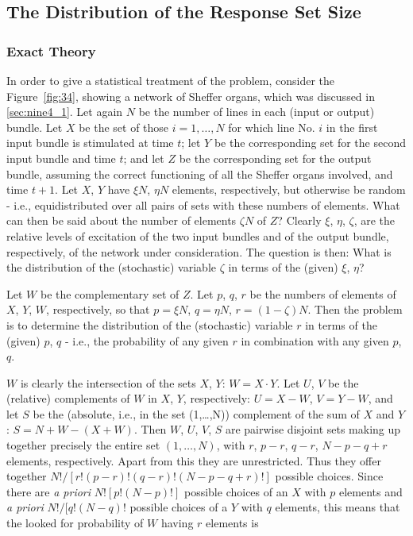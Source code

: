 \documentclass[twocolumn,preprintnumbers,amsmath,amssymb,floatfix]{revtex4}
\begin{document}
\subsection{\label{sec:ten2}The Distribution of the Response Set Size}

\subsubsection{\label{sec:ten2_1}Exact Theory} In order to give a
statistical treatment of the problem, consider the
Figure~\ref{fig:34}, showing a network of Sheffer organs, which
was discussed in \ref{sec:nine4_1}. Let again $N$ be the number of
lines in each (input or output) bundle. Let $X$ be the set of
those $i=1,\dots,N$ for which line No. $i$ in the first input
bundle is stimulated at time $t$; let $Y$ be the corresponding set
for the second input bundle and time $t$; and let $Z$ be the
corresponding set for the output bundle, assuming the correct
functioning of all the Sheffer organs involved, and time $t+1$.
Let $X$, $Y$ have $\xi N$, $\eta N$ elements, respectively, but
otherwise be random - i.e., equidistributed over all pairs of sets
with these numbers of elements. What can then be said about the
number of elements $\zeta N$ of $Z$? Clearly $\xi$, $\eta$,
$\zeta$, are the relative levels of excitation of the two input
bundles and of the output bundle, respectively, of the network
under consideration. The question is then: What is the
distribution of the (stochastic) variable $\zeta$ in terms of the
(given) $\xi$, $\eta$?

Let $W$ be the complementary set of $Z$. Let $p$, $q$, $r$ be the
numbers of elements of $X$, $Y$, $W$, respectively, so that $p=\xi
N$, $q=\eta N$, $r=(1-\zeta)N$. Then the problem is to determine
the distribution of the (stochastic) variable $r$ in terms of the
(given) $p$, $q$ - i.e., the probability of any given $r$ in
combination with any given $p$, $q$.

$W$ is clearly the intersection of the sets $X$, $Y$: $W=X\cdot
Y$. Let $U$, $V$ be the (relative) complements of $W$ in $X$, $Y$,
respectively: $U=X-W$, $V=Y-W$, and let $S$ be the (absolute,
i.e., in the set (1,\dots,N)) complement of the sum of $X$ and
$Y$: $S=N+W-(X+W)$. Then $W$, $U$, $V$, $S$ are pairwise disjoint
sets making up together precisely the entire set $(1,\ldots,N)$,
with $r$, $p-r$, $q-r$, $N-p-q+r$ elements, respectively. Apart
from this they are unrestricted. Thus they offer together
$N!/[r!(p-r)!(q-r)!(N-p-q+r)!]$ possible choices. Since there are
\textit{a priori} $N![p!(N-p)!]$ possible choices of an $X$ with
$p$ elements and \textit{a priori} $N!/[q!(N-q)!$ possible choices
of a $Y$ with $q$ elements, this means that the looked for
probability of $W$ having $r$ elements is
\end{document}
